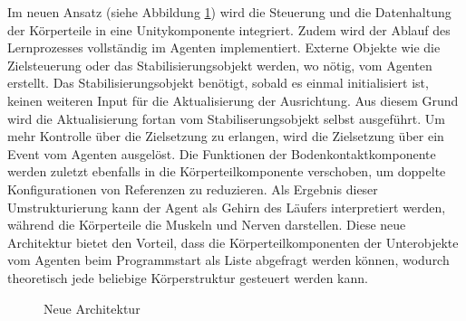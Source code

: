 Im neuen Ansatz (siehe Abbildung \ref{fig:architektur_neu}) wird die Steuerung und die Datenhaltung der Körperteile in eine Unitykomponente integriert. Zudem wird der Ablauf des Lernprozesses vollständig im Agenten implementiert. Externe Objekte wie die Zielsteuerung oder das Stabilisierungsobjekt werden, wo nötig, vom Agenten erstellt. Das Stabilisierungsobjekt benötigt, sobald es einmal initialisiert ist, keinen weiteren Input für die Aktualisierung der Ausrichtung. Aus diesem Grund wird die Aktualisierung fortan vom Stabiliserungsobjekt selbst ausgeführt. Um mehr Kontrolle über die Zielsetzung zu erlangen, wird die Zielsetzung über ein Event vom Agenten ausgelöst. Die Funktionen der Bodenkontaktkomponente werden zuletzt ebenfalls in die Körperteilkomponente verschoben, um doppelte Konfigurationen von Referenzen zu reduzieren. Als Ergebnis dieser Umstrukturierung kann der Agent als Gehirn des Läufers interpretiert werden, während die Körperteile die Muskeln und Nerven darstellen. Diese neue Architektur bietet den Vorteil, dass die Körperteilkomponenten der Unterobjekte vom Agenten beim Programmstart als Liste abgefragt werden können, wodurch theoretisch jede beliebige Körperstruktur gesteuert werden kann.

\begin{figure}[H]
  \centering  
  \caption{Neue Architektur}
  \label{fig:architektur_neu}
\end{figure}

